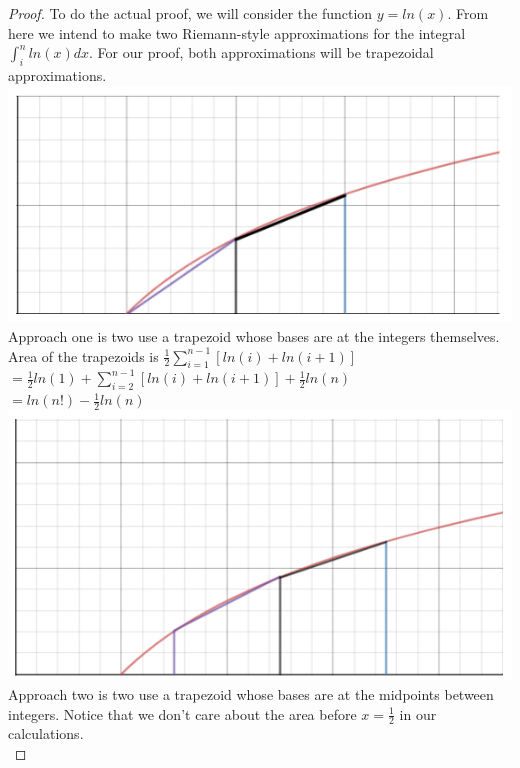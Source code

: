 \begin{proof}
To do the actual proof, we will consider the function $y=ln(x)$. From here we intend to make two Riemann-style approximations for the integral $\int_{i}^{n}{ln(x)dx}$. For our proof, both approximations will be trapezoidal approximations. \\

\includegraphics[width=20\baselineskip]{figures/trapezoidal_under.png}\\
Approach one is two use a trapezoid whose bases are at the integers themselves.\\

Area of the trapezoids is $\frac{1}{2}\sum_{i=1}^{n-1}{[ln(i)+ln(i+1)]}$\\
$=\frac{1}{2}ln(1)+\sum_{i=2}^{n-1}{[ln(i)+ln(i+1)]}+\frac{1}{2}ln(n)$\\
$=ln(n!)-\frac{1}{2}ln(n)$\\

\includegraphics[width=20\baselineskip]{figures/trapezoidal_over.png}\\
Approach two is two use a trapezoid whose bases are at the midpoints between integers. Notice that we don't care about the area before $x=\frac{1}{2}$ in our calculations.\\ 


\end{proof}
